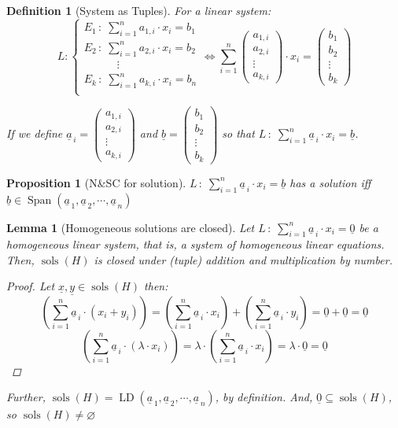 \documentclass[12pt]{article}
\let\emptyset\varnothing
\let\LR\Leftrightarrow
\newcommand{\tuple}[1]{\underline{#1}}
\newcommand{\seqt}[2]{\left(\tuple{#1}_{\,1},\tuple{#1}_{\,2},\cdots,\tuple{#1}_{\,#2}\right)}
\DeclareMathOperator{\Span}{Span}
\DeclareMathOperator{\sols}{sols}
\DeclareMathOperator{\LD}{LD}
\newtheorem{definition}{Definition}[subsection]
\newtheorem{lemma}{Lemma}[subsection]
\newtheorem{proposition}{Proposition}[subsection]
\begin{document}
\begin{definition}[System as Tuples]
  For a linear system:
  $$
  L:\begin{cases}
    E_1\,:\;\sum_{i=1}^n a_{1,i}\cdot x_i=b_1\\
    E_2\,:\;\sum_{i=1}^n a_{2,i}\cdot x_i=b_2\\
    \quad\qquad\vdots\\
    E_k\,:\;\sum_{i=1}^n a_{k,i}\cdot x_i=b_n\\
  \end{cases}
  \LR
  \sum_{i=1}^n \begin{pmatrix}a_{1,i}\\a_{2,i}\\\vdots\\a_{k,i}\end{pmatrix}\cdot x_i=\begin{pmatrix}b_1\\b_2\\\vdots\\b_k\end{pmatrix}
  $$

  If we define $\tuple{a}_{\,i}=\begin{pmatrix}a_{1,i}\\a_{2,i}\\\vdots\\a_{k,i}\end{pmatrix}$ and $\tuple{b}=\begin{pmatrix}b_1\\b_2\\\vdots\\b_k\end{pmatrix}$ so that $\displaystyle L\,:\;\sum_{i=1}^n \tuple{a}_{\,i}\cdot x_i=\tuple{b}$.
\end{definition}

\begin{proposition}[N\&SC for solution]
  $\displaystyle L\,:\;\sum_{i=1}^n \tuple{a}_{\,i}\cdot x_i=\tuple{b}$ has a solution iff $\tuple{b}\in\Span\seqt{a}{n}$
\end{proposition}

\begin{lemma}[Homogeneous solutions are closed]
  Let $\displaystyle L\,:\;\sum_{i=1}^n \tuple{a}_{\,i}\cdot x_i=\tuple{0}$ be a homogeneous linear system, that is, a system of homogeneous linear equations. Then, $\sols(H)$ is closed under (tuple) addition and multiplication by number.
  \begin{proof}
    Let $\tuple{x},\tuple{y}\in\sols(H)$ then:
    $$\left(\sum_{i=1}^n \tuple{a}_{\,i}\cdot (x_i+y_i)\right)=\left(\sum_{i=1}^n \tuple{a}_{\,i}\cdot x_i\right)+\left(\sum_{i=1}^n  \tuple{a}_{\,i}\cdot y_i\right)=\tuple{0}+\tuple{0}=\tuple{0}$$
    $$\left(\sum_{i=1}^n \tuple{a}_{\,i}\cdot(\lambda\cdot x_i)\right)=\lambda\cdot \left(\sum_{i=1}^n \tuple{a}_{\,i}\cdot x_i \right)=\lambda\cdot\tuple{0}=\tuple{0}$$
  \end{proof}
  Further, $\sols(H)=\LD\seqt{a}{n}$, by definition. And, $\tuple{0}\subseteq\sols(H)$, so $\sols(H)\neq\emptyset$
\end{lemma}
\end{document}
